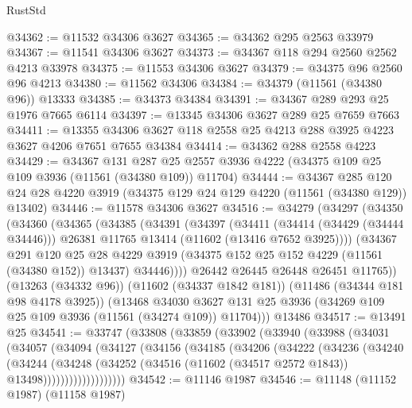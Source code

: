 \begin{lexlean}{RustStd}
\begin{coremodule}
@34362 := @11532 @34306 @3627
@34365 := @34362 @295 @2563 @33979
@34367 := @11541 @34306 @3627
@34373 := @34367 @118 @294 @2560 @2562 @4213 @33978
@34375 := @11553 @34306 @3627
@34379 := @34375 @96 @2560 @96 @4213
@34380 := @11562 @34306
@34384 := @34379 (@11561 (@34380 @96)) @13333
@34385 := @34373 @34384
@34391 := @34367 @289 @293 @25 @1976 @7665 @6114
@34397 := @13345 @34306 @3627 @289 @25 @7659 @7663
@34411 := @13355 @34306 @3627 @118 @2558 @25 @4213 @288 @3925 @4223 @3627 @4206 @7651 @7655 @34384
@34414 := @34362 @288 @2558 @4223
@34429 := @34367
    @131
    @287
    @25
    @2557
    @3936
    @4222
    (@34375 @109 @25 @109 @3936 (@11561 (@34380 @109)) @11704)
@34444 := @34367
    @285
    @120
    @24
    @28
    @4220
    @3919
    (@34375 @129 @24 @129 @4220 (@11561 (@34380 @129)) @13402)
@34446 := @11578 @34306 @3627
@34516 := @34279
    (@34297
      (@34350
        (@34360
          (@34365
            (@34385
              (@34391
                (@34397
                  (@34411
                    (@34414 (@34429 (@34444 @34446)))
                    @26381
                    @11765
                    @13414
                    (@11602 (@13416 @7652 @3925))))
                (@34367
                  @291
                  @120
                  @25
                  @28
                  @4229
                  @3919
                  (@34375 @152 @25 @152 @4229 (@11561 (@34380 @152)) @13437)
                  @34446))))
          @26442
          @26445
          @26448
          @26451
          @11765))
      (@13263 (@34332 @96))
      (@11602 (@34337 @1842 @181))
      (@11486 (@34344 @181 @98 @4178 @3925))
      (@13468
        @34030
        @3627
        @131
        @25
        @3936
        (@34269 @109 @25 @109 @3936 (@11561 (@34274 @109)) @11704)))
    @13486
@34517 := @13491 @25
@34541 := @33747
    (@33808
      (@33859
        (@33902
          (@33940
            (@33988
              (@34031
                (@34057
                  (@34094
                    (@34127
                      (@34156
                        (@34185
                          (@34206
                            (@34222
                              (@34236
                                (@34240
                                  (@34244
                                    (@34248
                                      (@34252
                                        (@34516
                                          (@11602 (@34517 @2572 @1843))
                                          @13498)))))))))))))))))))
@34542 := @11146 @1987
@34546 := @11148 (@11152 @1987) (@11158 @1987)

\end{coremodule}
\end{lexlean}
